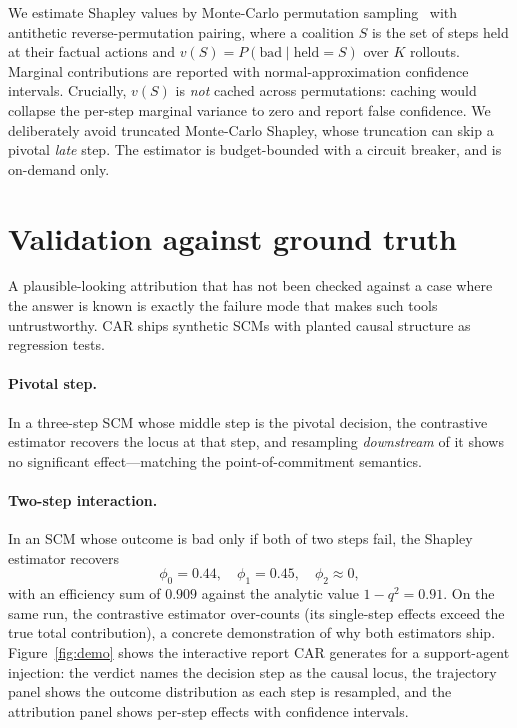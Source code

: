 \documentclass[11pt]{article}
\begin{document}
We estimate Shapley values by Monte-Carlo permutation sampling~\cite{castro2009} with antithetic
reverse-permutation pairing, where a coalition $S$ is the set of steps held at their factual
actions and $v(S) = P(\text{bad} \mid \text{held} = S)$ over $K$ rollouts. Marginal contributions
are reported with normal-approximation confidence intervals. Crucially, $v(S)$ is \emph{not} cached
across permutations: caching would collapse the per-step marginal variance to zero and report false
confidence. We deliberately avoid truncated Monte-Carlo Shapley, whose truncation can skip a
pivotal \emph{late} step. The estimator is budget-bounded with a circuit breaker, and is on-demand
only.

\section{Validation against ground truth}
\label{sec:eval}

A plausible-looking attribution that has not been checked against a case where the answer is known
is exactly the failure mode that makes such tools untrustworthy. CAR ships synthetic SCMs with
planted causal structure as regression tests.

\paragraph{Pivotal step.} In a three-step SCM whose middle step is the pivotal decision, the
contrastive estimator recovers the locus at that step, and resampling \emph{downstream} of it
shows no significant effect---matching the point-of-commitment semantics.

\paragraph{Two-step interaction.} In an SCM whose outcome is bad only if both of two steps fail,
the Shapley estimator recovers
\[
\phi_0 = 0.44,\quad \phi_1 = 0.45,\quad \phi_2 \approx 0,
\]
with an efficiency sum of $0.909$ against the analytic value $1 - q^2 = 0.91$. On the same run, the
contrastive estimator over-counts (its single-step effects exceed the true total contribution), a
concrete demonstration of why both estimators ship. Figure~\ref{fig:demo} shows the interactive
report CAR generates for a support-agent injection: the verdict names the decision step as the
causal locus, the trajectory panel shows the outcome distribution as each step is resampled, and
the attribution panel shows per-step effects with confidence intervals.
\end{document}
